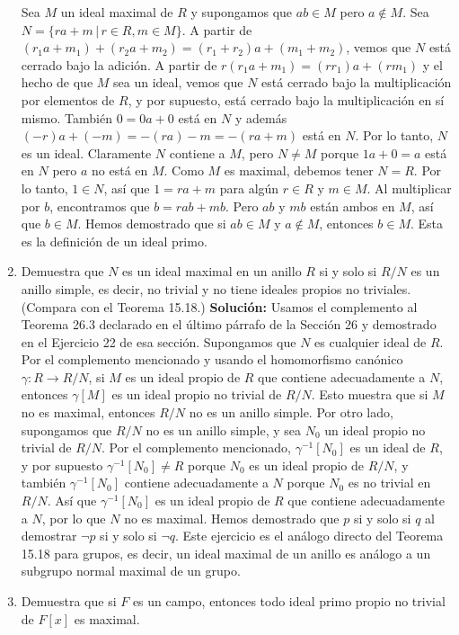 \begin{enumerate}
     Sea $M$ un ideal maximal de $R$ y supongamos que $ab \in M$ pero $a \notin M$. Sea $N = \{ra + m \,|\, r \in R, m \in M\}$. 
     A partir de $(r_1a + m_1) + (r_2a + m_2) = (r_1 + r_2)a + (m_1 + m_2)$, vemos que $N$ está cerrado bajo la adición. A partir de $r(r_1a + m_1) = (rr_1)a + (rm_1)$ y el hecho de que $M$ sea un ideal, vemos que $N$ está cerrado bajo la multiplicación por elementos de $R$, y por supuesto, está cerrado bajo la multiplicación en sí mismo. También $0 = 0a + 0$ está en $N$ y además $(-r)a + (-m) = -(ra) - m = -(ra + m)$
     está en $N$. Por lo tanto, $N$ es un ideal. Claramente $N$ contiene a $M$, pero $N \neq M$ porque $1a + 0 = a$ está en $N$ pero $a$ no está en $M$. Como $M$ es maximal, debemos tener $N = R$. Por lo tanto, $1 \in N$, así que $1 = ra + m$ para algún $r \in R$ y $m \in M$. Al multiplicar por $b$, encontramos que $b = rab + mb$. Pero $ab$ y $mb$ están ambos en $M$, así que $b \in M$. 
     Hemos demostrado que si $ab \in M$ y $a \notin M$, entonces $b \in M$. Esta es la definición de un ideal primo.
    \item Demuestra que $N$ es un ideal maximal en un anillo $R$ si y solo si $R/N$ es un anillo simple, es decir, no trivial y no tiene ideales propios no triviales. (Compara con el Teorema 15.18.)
    \textbf{Solución:} Usamos el complemento al Teorema 26.3 declarado en el último párrafo de la Sección 26 y demostrado en el Ejercicio 22 de esa sección. Supongamos que $N$ es cualquier ideal de $R$. Por el complemento mencionado y usando el homomorfismo canónico $\gamma: R \rightarrow R/N$, si $M$ es un ideal propio de $R$ que contiene adecuadamente a $N$, entonces $\gamma[M]$ es un ideal propio no trivial de $R/N$. Esto muestra que si $M$ no es maximal, entonces $R/N$ no es un anillo simple. Por otro lado, supongamos que $R/N$ no es un anillo simple, y sea $N_0$ un ideal propio no trivial de $R/N$. Por el complemento mencionado, $\gamma^{-1}[N_0]$ es un ideal de $R$, y por supuesto $\gamma^{-1}[N_0] \neq R$ porque $N_0$ es un ideal propio de $R/N$, y también $\gamma^{-1}[N_0]$ contiene adecuadamente a $N$ porque $N_0$ es no trivial en $R/N$. Así que $\gamma^{-1}[N_0]$ es un ideal propio de $R$ que contiene adecuadamente a $N$, por lo que $N$ no es maximal. Hemos demostrado que $p$ si y solo si $q$ al demostrar $\neg p$ si y solo si $\neg q$. Este ejercicio es el análogo directo del Teorema 15.18 para grupos, es decir, un ideal maximal de un anillo es análogo a un subgrupo normal maximal de un grupo.
    \item Demuestra que si $F$ es un campo, entonces todo ideal primo propio no trivial de $F[x]$ es maximal.

\end{enumerate}
